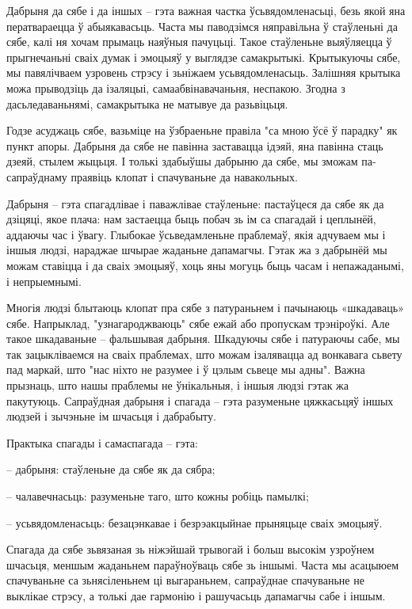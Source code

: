 Дабрыня да сябе і да іншых – гэта важная частка ўсьвядомленасьці, безь якой яна ператвараецца ў абыякавасьць. Часта мы паводзімся няправільна ў стаўленьні да сябе, калі ня хочам прымаць наяўныя пачуцьці. Такое стаўленьне выяўляецца ў прыгнечаньні сваіх думак і эмоцыяў у выглядзе самакрытыкі. Крытыкуючы сябе, мы павялічваем узровень стрэсу і зьніжаем усьвядомленасьць. Залішняя крытыка можа прыводзіць да ізаляцыі, самаабвінавачаньня, неспакою. Згодна з дасьледаваньнямі, самакрытыка не матывуе да разьвіцьця.

Годзе асуджаць сябе, вазьміце на ўзбраеньне правіла "са мною ўсё ў парадку" як пункт апоры. Дабрыня да сябе не павінна заставацца ідэяй, яна павінна стаць дзеяй, стылем жыцьця. І толькі здабыўшы дабрыню да сябе, мы зможам па-сапраўднаму праявіць клопат і спачуваньне да навакольных.

Дабрыня – гэта спагадлівае і паважлівае стаўленьне: пастаўцеся да сябе як да дзіцяці, якое плача: нам застаецца быць побач зь ім са спагадай і цеплынёй, аддаючы час і ўвагу. Глыбокае ўсьведамленьне праблемаў, якія адчуваем мы і іншыя людзі, нараджае шчырае жаданьне дапамагчы. Гэтак жа з дабрынёй мы можам ставіцца і да сваіх эмоцыяў, хоць яны могуць быць часам і непажаданымі, і непрыемнымі.

Многія людзі блытаюць клопат пра сябе з патураньнем і пачынаюць «шкадаваць» сябе. Напрыклад, "узнагароджваюць" сябе ежай або пропускам трэніроўкі. Але такое шкадаваньне – фальшывая дабрыня. Шкадуючы сябе і патураючы сабе, мы так зацыкліваемся на сваіх праблемах, што можам ізалявацца ад вонкавага сьвету пад маркай, што "нас ніхто не разумее і ў цэлым сьвеце мы адны". Важна прызнаць, што нашы праблемы не ўнікальныя, і іншыя людзі гэтак жа пакутуюць. Сапраўдная дабрыня і спагада – гэта разуменьне цяжкасьцяў іншых людзей і зычэньне ім шчасьця і дабрабыту.

Практыка спагады і самаспагада – гэта: 

– дабрыня: стаўленьне да сябе як да сябра;

– чалавечнасьць: разуменьне таго, што кожны робіць памылкі;

– усьвядомленасьць: безацэнкавае і безрэакцыйнае прыняцьце сваіх эмоцыяў.

Спагада да сябе зьвязаная зь ніжэйшай трывогай і больш высокім узроўнем шчасьця, меншым жаданьнем параўноўваць сябе зь іншымі. Часта мы асацыюем спачуваньне са зьнясіленьнем ці выгараньнем, сапраўднае спачуваньне не выклікае стрэсу, а толькі дае гармонію і рашучасьць дапамагчы сабе і іншым.

